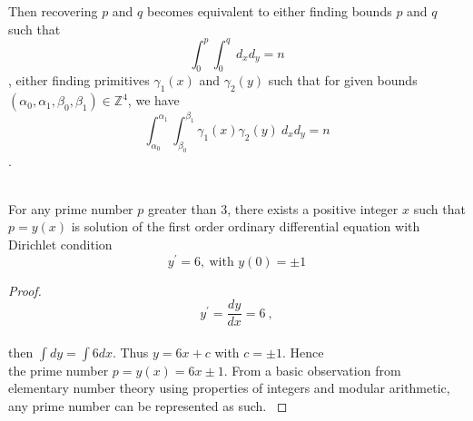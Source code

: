 \documentclass[sigconf,balance=false]{acmart}
\begin{document}
Then recovering $p$ and $q$ becomes equivalent to either finding bounds $p$ and $q$ such that $$\displaystyle\int_{0}^{p} \int_{0}^{q} \ d_{x}d_{y}=n$$, either finding primitives $\gamma_{1}(x)$ and $\gamma_{2}(y)$ such that for given bounds $\left(\alpha_{0},\alpha_{1}, \beta_{0}, \beta_{1}\right)\in \mathbb{Z}^{4}$, we have $$\displaystyle\int_{\alpha_{0}}^{\alpha_{1}} \int_{\beta_{0}}^{\beta_{1}}\gamma_{1}(x)\gamma_{2}(y) \ d_{x}d_{y}=n$$.
\begin{lemma} \label{lem1}\ \\ \rm{
For any prime number $p$ greater than 3, there exists a positive integer $x$ such that $p=y(x)$ is solution of the first order ordinary differential equation with Dirichlet condition $$ y^{'}=6, \ \text{with \ \ }  y(0)=\pm 1$$
}
\end{lemma}
\begin{proof} \ \\ \rm{
$$y^{'}=\frac{dy}{dx}=6 \ ,$$\\
then $\int dy=\int 6dx$. Thus $y=6x+c$ with $c=\pm 1$. Hence \\ the prime number $p=y(x)=6x \pm 1$. From a basic observation from elementary number theory using properties of integers and modular arithmetic, any prime number can be represented as such.
}
\end{proof}
\end{document}
